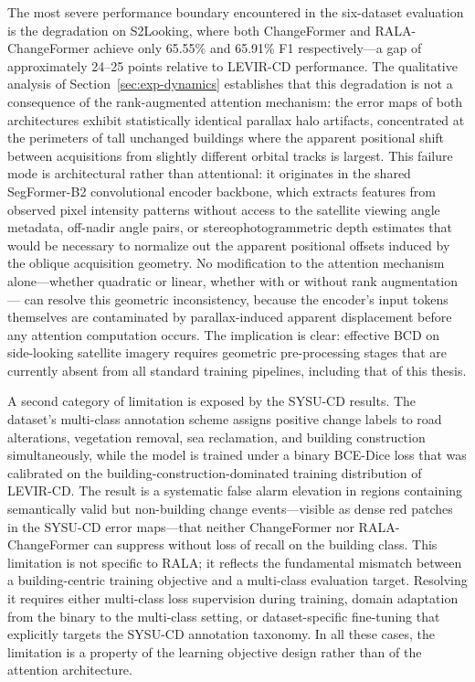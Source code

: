 The most severe performance boundary encountered in the six-dataset evaluation
is the degradation on S2Looking, where both ChangeFormer and RALA-ChangeFormer
achieve only 65.55\% and 65.91\% F1 respectively---a gap of approximately
24--25 points relative to LEVIR-CD performance. The qualitative analysis of
Section~\ref{sec:exp-dynamics} establishes that this degradation is not a
consequence of the rank-augmented attention mechanism: the error maps of both
architectures exhibit statistically identical parallax halo artifacts, concentrated
at the perimeters of tall unchanged buildings where the apparent positional shift
between acquisitions from slightly different orbital tracks is largest. This
failure mode is architectural rather than attentional: it originates in the
shared SegFormer-B2 convolutional encoder backbone, which extracts features from
observed pixel intensity patterns without access to the satellite viewing angle
metadata, off-nadir angle pairs, or stereophotogrammetric depth estimates that
would be necessary to normalize out the apparent positional offsets induced by
the oblique acquisition geometry. No modification to the attention mechanism
alone---whether quadratic or linear, whether with or without rank augmentation---
can resolve this geometric inconsistency, because the encoder's input tokens
themselves are contaminated by parallax-induced apparent displacement before
any attention computation occurs. The implication is clear: effective BCD on
side-looking satellite imagery requires geometric pre-processing stages that
are currently absent from all standard training pipelines, including that of
this thesis.

A second category of limitation is exposed by the SYSU-CD results. The dataset's
multi-class annotation scheme assigns positive change labels to road alterations,
vegetation removal, sea reclamation, and building construction simultaneously,
while the model is trained under a binary BCE-Dice loss that was calibrated on
the building-construction-dominated training distribution of LEVIR-CD. The result
is a systematic false alarm elevation in regions containing semantically valid
but non-building change events---visible as dense red patches in the SYSU-CD
error maps---that neither ChangeFormer nor RALA-ChangeFormer can suppress without
loss of recall on the building class. This limitation is not specific to RALA;
it reflects the fundamental mismatch between a building-centric training objective
and a multi-class evaluation target. Resolving it requires either multi-class
loss supervision during training, domain adaptation from the binary to the
multi-class setting, or dataset-specific fine-tuning that explicitly targets the
SYSU-CD annotation taxonomy. In all these cases, the limitation is a property
of the learning objective design rather than of the attention architecture.


